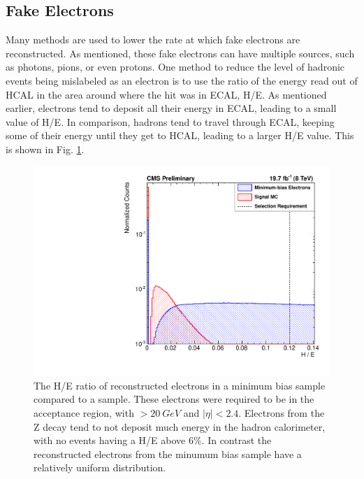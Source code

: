 \subsection{Fake Electrons}
Many methods are used to lower the rate at which fake electrons are reconstructed. As mentioned, these fake electrons can have multiple sources, such as photons, pions, or even protons. One method to reduce the level of hadronic events being mislabeled as an electron is to use the ratio of the energy read out of HCAL in the area around where the hit was in ECAL, H/E. As mentioned earlier, electrons tend to deposit all their energy in ECAL, leading to a small value of H/E. In comparison, hadrons tend to travel through ECAL, keeping some of their energy until they get to HCAL, leading to a larger H/E value. This is shown in Fig. \ref{fig:HadronOverElectron}.

\begin{figure}[!htbp]
    \centering
    \includegraphics[width=\linewidth]{figures/EventSelection/AlexsEventSelectionFigures/e_reco_var_he.pdf}
    \caption[H/E comparison]{The H/E ratio of reconstructed electrons in a minimum bias sample compared to a \MADGRAPH \Ztoee sample. These electrons were required to be in the acceptance region, with \pt $>\SI{20}{GeV}$ and $|\eta|<2.4$. Electrons from the Z decay tend to not deposit much energy in the hadron calorimeter, with no events having a H/E above 6\%. In contrast the reconstructed electrons from the minumum bias sample have a relatively uniform distribution.}
    \label{fig:HadronOverElectron}
\end{figure}

